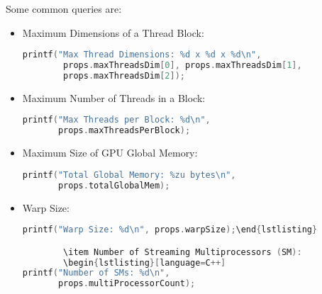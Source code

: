 \begin{examplebox}
    Some common queries are:
    \begin{itemize}
        \item Maximum Dimensions of a Thread Block:
        \begin{lstlisting}[language=C++]
printf("Max Thread Dimensions: %d x %d x %d\n",
        props.maxThreadsDim[0], props.maxThreadsDim[1],
        props.maxThreadsDim[2]);\end{lstlisting}

        \item Maximum Number of Threads in a Block:
        \begin{lstlisting}[language=C++]
printf("Max Threads per Block: %d\n",
       props.maxThreadsPerBlock);\end{lstlisting}

        \newpage

        \item Maximum Size of GPU Global Memory:
        \begin{lstlisting}[language=C++]
printf("Total Global Memory: %zu bytes\n",
       props.totalGlobalMem);\end{lstlisting}

        \item Warp Size:
        \begin{lstlisting}[language=C++]
printf("Warp Size: %d\n", props.warpSize);\end{lstlisting}

        \item Number of Streaming Multiprocessors (SM):
        \begin{lstlisting}[language=C++]
printf("Number of SMs: %d\n",
       props.multiProcessorCount);\end{lstlisting}

    \end{itemize}
\end{examplebox}

